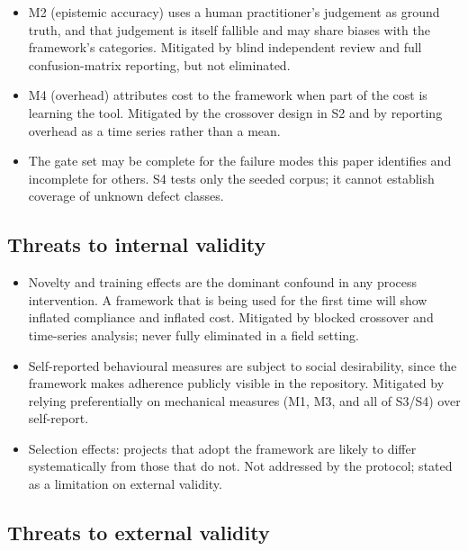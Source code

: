 \documentclass[11pt,a4paper]{article}
\begin{document}
\begin{itemize}[leftmargin=*,nosep,topsep=2pt]
\item M2 (epistemic accuracy) uses a human practitioner's judgement as ground   truth, and that judgement is itself fallible and may share biases with the   framework's categories. Mitigated by blind independent review and full   confusion-matrix reporting, but not eliminated.
\item M4 (overhead) attributes cost to the framework when part of the cost is   learning the tool. Mitigated by the crossover design in S2 and by reporting   overhead as a time series rather than a mean.
\item The gate set may be complete for the failure modes this paper identifies   and incomplete for others. S4 tests only the seeded corpus; it cannot   establish coverage of unknown defect classes.
\end{itemize}

\subsection{Threats to internal validity}

\begin{itemize}[leftmargin=*,nosep,topsep=2pt]
\item Novelty and training effects are the dominant confound in any process   intervention. A framework that is being used for the first time will show   inflated compliance and inflated cost. Mitigated by blocked crossover and   time-series analysis; never fully eliminated in a field setting.
\item Self-reported behavioural measures are subject to social desirability, since   the framework makes adherence publicly visible in the repository. Mitigated   by relying preferentially on mechanical measures (M1, M3, and all of S3/S4)   over self-report.
\item Selection effects: projects that adopt the framework are likely to differ   systematically from those that do not. Not addressed by the protocol; stated   as a limitation on external validity.
\end{itemize}

\subsection{Threats to external validity}
\end{document}
